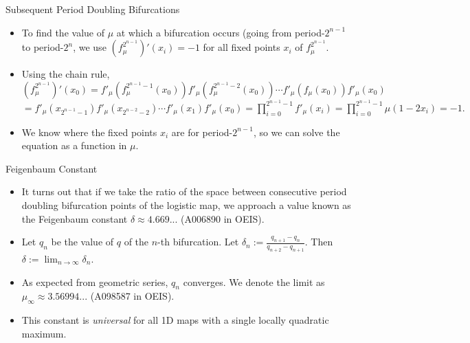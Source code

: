 \documentclass[aspectratio=169]{beamer}
\begin{document}
\begin{frame}{Subsequent Period Doubling Bifurcations}
\begin{itemize}
    \item To find the value of $\mu$ at which a bifurcation occurs (going from period-$2^{n-1}$ to period-$2^n$, we use $(f_\mu^{2^{n-1}})'(x_i) = -1$ for all fixed points $x_i$ of $f_\mu^{2^{n-1}}$. 
    \item Using the chain rule, $(f_\mu^{2^{n-1}})'(x_0) = f'_\mu(f^{2^{n-1}-1}_\mu(x_0))f'_\mu(f^{2^{n-1}-2}_\mu(x_0)) \cdots f'_\mu(f_\mu(x_0)) f'_\mu(x_0)$ $= f'_\mu(x_{2^{n-1}-1}) f'_\mu(x_{2^{n-2}-2}) \cdots f'_\mu(x_1) f'_\mu(x_0) = \displaystyle \prod_{i=0}^{2^{n-1}-1} f'_\mu(x_i) = \displaystyle \prod_{i=0}^{2^{n-1}-1} \mu(1-2x_i) = -1.$
    \item We know where the fixed points $x_i$ are for period-$2^{n-1}$, so we can solve the equation as a function in $\mu$.
\end{itemize}
\end{frame}

\begin{frame}{Feigenbaum Constant}
\begin{itemize}
    \item It turns out that if we take the ratio of the space between consecutive period doubling bifurcation points of the logistic map, we approach a value known as the Feigenbaum constant $\delta \approx 4.669...$ (A006890 in OEIS). 
    \item Let $q_n$ be the value of $q$ of the $n$-th bifurcation. Let $\delta_n := \frac{q_{n+1} - q_n}{q_{n+2} - q_{n+1}}$. Then $\delta := \displaystyle \lim_{n \rightarrow \infty} \delta_n$. 
    \item As expected from geometric series, $q_n$ converges. We denote the limit as $\mu_\infty \approx 3.56994...$ (A098587 in OEIS). 
    \item This constant is \textit{universal} for all 1D maps with a single locally quadratic maximum. 
\end{itemize}
\end{frame}
\end{document}

